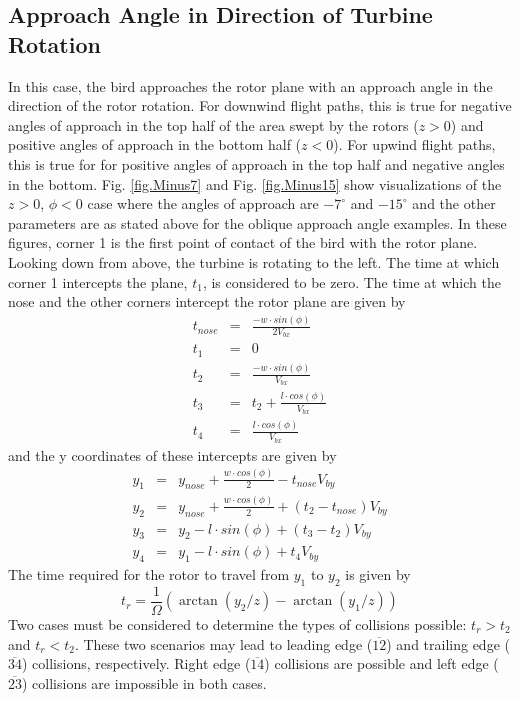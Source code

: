 \label{} \documentclass[10pt,conference]{IEEEtran}
\begin{document}
\subsection{Approach Angle in Direction of Turbine Rotation}
In this case, the bird approaches the rotor plane with an approach angle in the direction of the rotor rotation. For
downwind flight paths, this is true for negative angles of approach in the top half of the area swept by the rotors
($z>0$) and positive angles of approach in the bottom half ($z<0$). For upwind flight paths, this is true for for
positive angles of approach in the top half and negative angles in the bottom. Fig. \ref{fig.Minus7} and Fig.
\ref{fig.Minus15} show visualizations of the $z>0$, $\phi<0$ case where the angles of approach are $-7^\circ$ and
$-15^\circ$ and the other parameters are as stated above for the oblique approach angle examples. In these figures,
corner 1 is the first point of contact of the bird with the rotor plane. Looking down from above, the turbine is
rotating to the left. The time at which corner 1 intercepts the plane, $t_1$, is considered to be zero. The time at
which the nose and the other corners intercept the rotor plane are given by
\begin{eqnarray*}
    t_{nose} &=& \frac{-w \cdot sin(\phi)}{2 V_{bx}}\\
    t_1 &=& 0\\
    t_2 &=& \frac{-w \cdot sin(\phi)}{V_{bx}}\\
    t_3 &=& t_2 + \frac{l \cdot cos(\phi)}{V_{bx}}\\
    t_4 &=& \frac{l \cdot cos(\phi)}{V_{bx}}
\end{eqnarray*}
and the y coordinates of these intercepts are given by
\begin{eqnarray*}
    y_1 &=& y_{nose}+\frac{w \cdot cos(\phi)}{2}-t_{nose}V_{by}\\
    y_2 &=& y_{nose}+\frac{w \cdot cos(\phi)}{2}+(t_2-t_{nose})V_{by}\\
    y_3 &=& y_2-l \cdot sin(\phi) + (t_3-t_2)V_{by}\\
    y_4 &=& y_1-l \cdot sin(\phi) + t_4V_{by}
\end{eqnarray*}
The time required for the rotor to travel from $y_1$ to $y_2$ is given by
\begin{equation*}
    t_r = \frac{1}{\Omega}(\arctan(y_2/z)-\arctan(y_1/z))
\end{equation*}
Two cases must be considered to determine the types of collisions possible: $t_r>t_2$ and $t_r<t_2$. These two
scenarios may lead to leading edge ($\overline{12}$) and trailing edge ($\overline{34}$) collisions, respectively.
Right edge ($\overline{14}$) collisions are possible and left edge ($\overline{23}$) collisions are impossible in both
cases.
\end{document}
